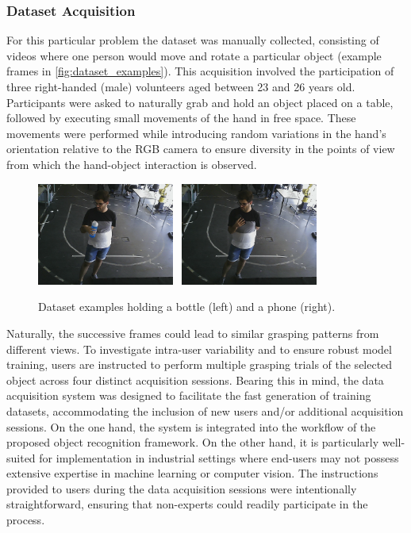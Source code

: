 \subsubsection{Dataset Acquisition}

For this particular problem the dataset was manually collected, consisting of videos where one person would move and rotate a particular object (example frames in \autoref{fig:dataset_examples}). This acquisition involved the participation of three right-handed (male) volunteers aged between 23 and 26 years old. Participants were asked to naturally grab and hold an object placed on a table, followed by executing small movements of the hand in free space. These movements were performed while introducing random variations in the hand’s orientation relative to the RGB camera to ensure diversity in the points of view from which the hand-object interaction is observed.

\begin{figure}[ht]
    \centerline{\includegraphics[width=0.4\textwidth]{figs/dataset_preprocessing1_1.png} \ \includegraphics[width=0.4\textwidth]{figs/dataset_preprocessing1_2.png}}
    \caption{Dataset examples holding a bottle (left) and a phone (right).}
    \label{fig:dataset_examples}
\end{figure}

Naturally, the successive frames could lead to similar grasping patterns from different views. To investigate intra-user variability and to ensure robust model training, users are instructed to perform multiple grasping trials of the selected object across four distinct acquisition sessions. Bearing this in mind, the data acquisition system was designed to facilitate the fast generation of training datasets, accommodating the inclusion of new users and/or additional acquisition sessions. On the one hand, the system is integrated into the workflow of the proposed object recognition framework. On the other hand, it is particularly well-suited for implementation in industrial settings where end-users may not possess extensive expertise in machine learning or computer vision. The instructions provided to users during the data acquisition sessions were intentionally straightforward, ensuring that non-experts could readily participate in the process.

